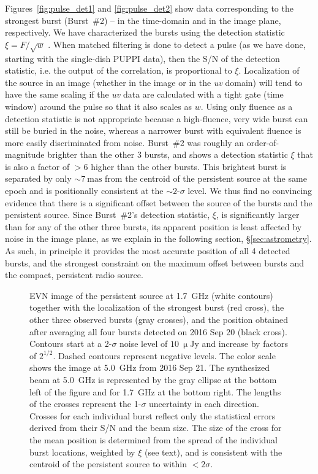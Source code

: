\documentclass[twocolumn]{aastex61}
\begin{document}
Figures~\ref{fig:pulse_det1} and \ref{fig:pulse_det2} show data corresponding to the strongest burst (Burst~\#2) -- in the time-domain and in the image plane, respectively.  We have characterized the bursts using the detection statistic $\xi = F/\sqrt{w}$ \citep[fluence divided by the square-root of the burst width; e.g.,][]{cm03,ttw+13}.  When matched filtering is done to detect a pulse (as we have done, starting with the single-dish PUPPI data), then the S/N of the detection statistic, i.e. the output of the correlation, is proportional to $\xi$.  Localization of the source in an image (whether in the image or in the {\it uv} domain) will tend to have the same scaling if the {\it uv} data are calculated with a tight gate (time window) around the pulse so that it also scales as $w$.  Using only fluence as a detection statistic is not appropriate because a high-fluence, very wide burst can still be buried in the noise, whereas a narrower burst with equivalent fluence is more easily discriminated from noise.  Burst~\#2 was roughly an order-of-magnitude brighter than the other 3 bursts, and shows a detection statistic $\xi$ that is also a factor of $> 6$ higher than the other bursts.  This brightest burst is separated by only $\sim 7~\mathrm{mas}$ from the centroid of the persistent source at the same epoch and is positionally consistent at the $\sim 2$-$\sigma$ level.  We thus find no convincing evidence that there is a significant offset between the source of the bursts and the persistent source.  Since Burst~\#2's detection statistic, $\xi$, is significantly larger than for any of the other three bursts, its apparent position is least affected by noise in the image plane, as we explain in the following section, \S\ref{sec:astrometry}.  As such, in principle it provides the most accurate position of all 4 detected bursts, and the strongest constraint on the maximum offset between bursts and the compact, persistent radio source.

\begin{figure}[t!]
	\caption{EVN image of the persistent source at 1.7~GHz (white contours) together with the localization of the strongest burst (red cross), the other three observed bursts (gray crosses), and the position obtained after averaging all four bursts detected on 2016 Sep 20 (black cross).  Contours start at a 2-$\sigma$ noise level of $10~\mathrm{\upmu Jy}$ and increase by factors of $2^{1/2}$.  Dashed contours represent negative levels. The color scale shows the image at 5.0~GHz from 2016 Sep 21. The synthesized beam at 5.0~GHz is represented by the gray ellipse at the bottom left of the figure and for 1.7~GHz at the bottom right.  The lengths of the crosses represent the 1-$\sigma$ uncertainty in each direction.  
    Crosses for each individual burst reflect only the statistical errors derived from their S/N and the beam size.  The size of the cross for the mean position is determined from the spread of the individual burst locations, weighted by $\xi$ (see text), and is consistent with the centroid of the persistent source to within $< 2\sigma$.
	\label{fig:burst_image}}
\end{figure}
\end{document}
